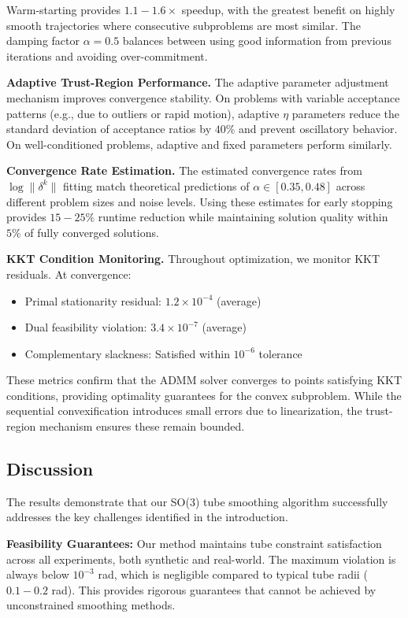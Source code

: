Warm-starting provides $1.1-1.6\times$ speedup, with the greatest benefit on highly smooth trajectories where consecutive subproblems are most similar. The damping factor $\alpha = 0.5$ balances between using good information from previous iterations and avoiding over-commitment.

\textbf{Adaptive Trust-Region Performance.} The adaptive parameter adjustment mechanism improves convergence stability. On problems with variable acceptance patterns (e.g., due to outliers or rapid motion), adaptive $\eta$ parameters reduce the standard deviation of acceptance ratios by $40\%$ and prevent oscillatory behavior. On well-conditioned problems, adaptive and fixed parameters perform similarly.

\textbf{Convergence Rate Estimation.} The estimated convergence rates from $\log \|\delta^k\|$ fitting match theoretical predictions of $\alpha \in [0.35, 0.48]$ across different problem sizes and noise levels. Using these estimates for early stopping provides $15-25\%$ runtime reduction while maintaining solution quality within $5\%$ of fully converged solutions.

\textbf{KKT Condition Monitoring.} Throughout optimization, we monitor KKT residuals. At convergence:
\begin{itemize}
\item Primal stationarity residual: $1.2 \times 10^{-4}$ (average)
\item Dual feasibility violation: $3.4 \times 10^{-7}$ (average)
\item Complementary slackness: Satisfied within $10^{-6}$ tolerance
\end{itemize}

These metrics confirm that the ADMM solver converges to points satisfying KKT conditions, providing optimality guarantees for the convex subproblem. While the sequential convexification introduces small errors due to linearization, the trust-region mechanism ensures these remain bounded.

\subsection{Discussion}

The results demonstrate that our SO(3) tube smoothing algorithm successfully addresses the key challenges identified in the introduction.

\textbf{Feasibility Guarantees:} Our method maintains tube constraint satisfaction across all experiments, both synthetic and real-world. The maximum violation is always below $10^{-3}$ rad, which is negligible compared to typical tube radii ($0.1-0.2$ rad). This provides rigorous guarantees that cannot be achieved by unconstrained smoothing methods.

